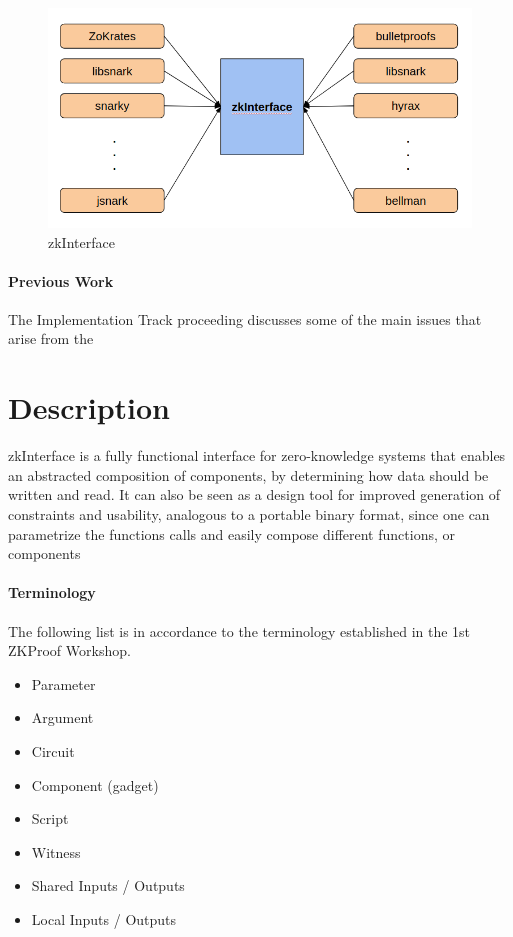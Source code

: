 \documentclass[a4paper,11pt]{article}
\begin{document}
	\begin{figure}[h!]
		\includegraphics[width=\linewidth]{interface.png}
		\caption{zkInterface}
		\label{interface}
	\end{figure}
	
	
	\paragraph{Previous Work}
	
	The Implementation Track proceeding discusses some of the main issues that arise from the 
	
	
	
	
	\section{Description}
	
	zkInterface is a fully functional interface for zero-knowledge systems that enables an abstracted composition of components, by determining how data should be written and read. It can also be seen as a design tool for improved generation of constraints and usability, analogous to a portable binary format, since one can parametrize the functions calls and easily compose different functions, or components
	
	\paragraph{Terminology}
	The following list is in accordance to the terminology established in the 1st ZKProof Workshop.
	
	\begin{itemize}
		\item Parameter
		\item Argument
		\item Circuit
		\item Component (gadget)
		\item Script
		\item Witness
		\item Shared Inputs / Outputs
		\item Local Inputs / Outputs
		
	\end{itemize}
	
\end{document}
